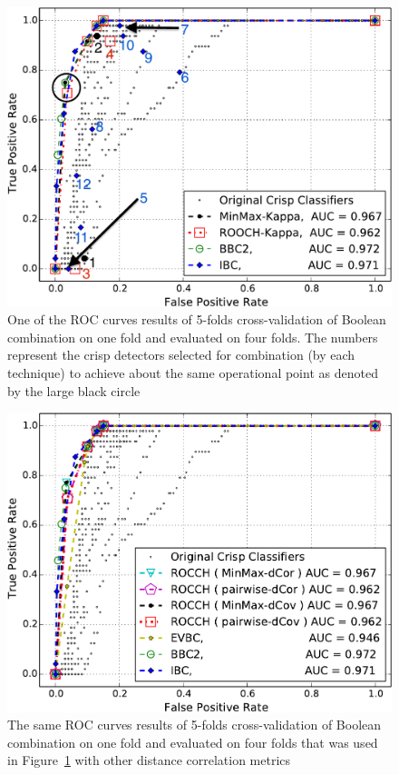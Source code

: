 \begin{figure}[t]
\centering
\includegraphics[width=\columnwidth]{figs/roc_curves_testing_fold3}
\caption{One of the ROC curves results of 5-folds cross-validation of Boolean combination on one fold and evaluated on four folds. The numbers represent the crisp detectors selected for combination (by each technique) to achieve about the same operational point as denoted by the large black circle}
\label{fig:roc_curves}
\end{figure}

\begin{figure}[t]
\centering
\includegraphics[scale=0.85]{figs/ADFA-dcov/IBC_BCC_Pruned_Classifier_ConvexHull_withoutRandom_validation}
\caption{The same ROC curves results of 5-folds cross-validation of Boolean combination on one fold and evaluated on four folds that was used in Figure~\ref{fig:roc_curves} with other distance correlation metrics}
\label{fig:roc_curves_dcov}
\end{figure}



